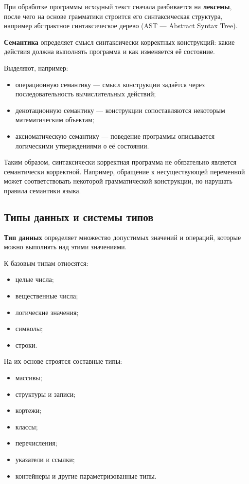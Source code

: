 При обработке программы исходный текст сначала разбивается на
\textbf{лексемы}, после чего на основе грамматики строится его синтаксическая
структура, например абстрактное синтаксическое дерево
(AST --- Abstract Syntax Tree).

\textbf{Семантика} определяет смысл синтаксически корректных конструкций:
какие действия должна выполнять программа и как изменяется её состояние.

Выделяют, например:

\begin{itemize}
	\item операционную семантику --- смысл конструкции задаётся через
	последовательность вычислительных действий;
	\item денотационную семантику --- конструкции сопоставляются некоторым
	математическим объектам;
	\item аксиоматическую семантику --- поведение программы описывается
	логическими утверждениями о её состоянии.
\end{itemize}

Таким образом, синтаксически корректная программа не обязательно является
семантически корректной. Например, обращение к несуществующей переменной может
соответствовать некоторой грамматической конструкции, но нарушать правила
семантики языка.

\subsection{Типы данных и системы типов}

\textbf{Тип данных} определяет множество допустимых значений и операций,
которые можно выполнять над этими значениями.

К базовым типам относятся:

\begin{itemize}
	\item целые числа;
	\item вещественные числа;
	\item логические значения;
	\item символы;
	\item строки.
\end{itemize}

На их основе строятся составные типы:

\begin{itemize}
	\item массивы;
	\item структуры и записи;
	\item кортежи;
	\item классы;
	\item перечисления;
	\item указатели и ссылки;
	\item контейнеры и другие параметризованные типы.
\end{itemize}

